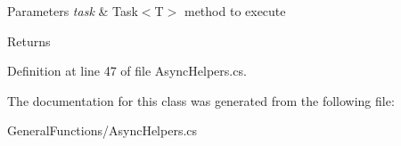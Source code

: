 \begin{DoxyParams}{Parameters}
{\em task} & Task$<$\+T$>$ method to execute\\
\hline
\end{DoxyParams}
\begin{DoxyReturn}{Returns}

\end{DoxyReturn}


Definition at line 47 of file Async\+Helpers.\+cs.



The documentation for this class was generated from the following file\+:\begin{DoxyCompactItemize}
\item 
General\+Functions/Async\+Helpers.\+cs\end{DoxyCompactItemize}

